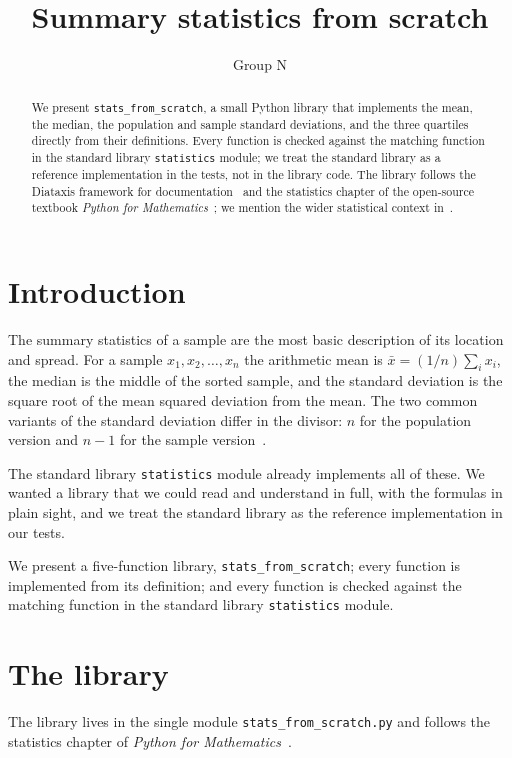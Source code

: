 \documentclass[11pt]{article}
\title{Summary statistics from scratch}
\author{Group N}
\date{}
\begin{document}
\maketitle

\begin{abstract}
We present \texttt{stats\_from\_scratch}, a small Python library
that implements the mean, the median, the population and sample
standard deviations, and the three quartiles directly from their
definitions. Every function is checked against the matching function
in the standard library \texttt{statistics} module; we treat the
standard library as a reference implementation in the tests, not in
the library code. The library follows the Diataxis framework for
documentation~\cite{procida2017} and the statistics chapter of the
open-source textbook \emph{Python for
Mathematics}~\cite{knight2024}; we mention the wider statistical
context in~\cite{rice2007}.
\end{abstract}

\section{Introduction}

The summary statistics of a sample are the most basic description of
its location and spread. For a sample
\(x_1, x_2, \dots, x_n\) the arithmetic mean is
\(\bar{x} = (1/n) \sum_i x_i\), the median is the middle of the
sorted sample, and the standard deviation is the square root of the
mean squared deviation from the mean. The two common variants of the
standard deviation differ in the divisor: \(n\) for the population
version and \(n - 1\) for the sample version~\cite{rice2007}.

The standard library \texttt{statistics} module already implements
all of these. We wanted a library that we could read and understand
in full, with the formulas in plain sight, and we treat the standard
library as the reference implementation in our tests.

We present a five-function library,
\texttt{stats\_from\_scratch}; every function is implemented from
its definition; and every function is checked against the matching
function in the standard library \texttt{statistics} module.

\section{The library}

The library lives in the single module
\texttt{stats\_from\_scratch.py} and follows the statistics chapter
of \emph{Python for Mathematics}~\cite{knight2024}.
\end{document}
